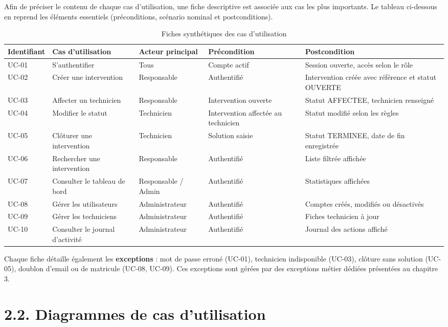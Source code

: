 \documentclass[11pt,a4paper]{report}
\begin{document}
Afin de préciser le contenu de chaque cas d'utilisation, une fiche descriptive est associée aux cas les plus importants. Le tableau ci-dessous en reprend les éléments essentiels (préconditions, scénario nominal et postconditions).
\begin{table}[htbp]\centering\small
\begin{tabularx}{\textwidth}{|X|X|X|X|X|}
\hline\rowcolor{hdr}\textbf{Identifiant} & \textbf{Cas d'utilisation} & \textbf{Acteur principal} & \textbf{Précondition} & \textbf{Postcondition}\\ \hline
UC-01 & S'authentifier & Tous & Compte actif & Session ouverte, accès selon le rôle\\ \hline
UC-02 & Créer une intervention & Responsable & Authentifié & Intervention créée avec référence et statut OUVERTE\\ \hline
UC-03 & Affecter un technicien & Responsable & Intervention ouverte & Statut AFFECTEE, technicien renseigné\\ \hline
UC-04 & Modifier le statut & Technicien & Intervention affectée au technicien & Statut modifié selon les règles\\ \hline
UC-05 & Clôturer une intervention & Technicien & Solution saisie & Statut TERMINEE, date de fin enregistrée\\ \hline
UC-06 & Rechercher une intervention & Responsable & Authentifié & Liste filtrée affichée\\ \hline
UC-07 & Consulter le tableau de bord & Responsable / Admin & Authentifié & Statistiques affichées\\ \hline
UC-08 & Gérer les utilisateurs & Administrateur & Authentifié & Comptes créés, modifiés ou désactivés\\ \hline
UC-09 & Gérer les techniciens & Administrateur & Authentifié & Fiches technicien à jour\\ \hline
UC-10 & Consulter le journal d'activité & Administrateur & Authentifié & Journal des actions affiché\\ \hline
\end{tabularx}
\caption{Fiches synthétiques des cas d'utilisation}
\end{table}

Chaque fiche détaille également les \textbf{exceptions} : mot de passe erroné (UC-01), technicien indisponible (UC-03), clôture sans solution (UC-05), doublon d'email ou de matricule (UC-08, UC-09). Ces exceptions sont gérées par des exceptions métier dédiées présentées au chapitre 3.
\section*{2.2. Diagrammes de cas d'utilisation}
\end{document}
